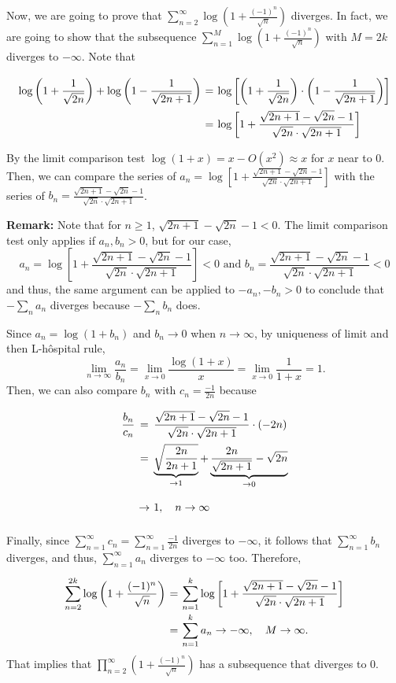 Now, we are going to prove that $\sum_{n = 2}^{\infty}\log\left( 1+\frac{(-1)^n}{\sqrt{n}} \right)$ diverges. In fact, we are going to show that the subsequence $\sum_{n = 1}^M\log\left( 1+\frac{(-1)^n}{\sqrt{n}} \right)$ with $M = 2k$ diverges to $-\infty$. Note that
\[ \everymath{\displaystyle}
\arraycolsep=1.8pt\def\arraystretch{2.5}
\begin{array}{rcl}
    \log\left( 1+\frac{1}{\sqrt{2n}} \right) +  \log\left( 1-\frac{1}{\sqrt{2n+1}} \right) & = & \log \left[ \left( 1+\frac{1}{\sqrt{2n}} \right) \cdot \left( 1-\frac{1}{\sqrt{2n+1}} \right) \right]\\
    & = & \log\left[1 + \frac{\sqrt{2n+1}-\sqrt{2n}-1}{\sqrt{2n} \cdot \sqrt{2n+1}} \right]
\end{array} \]

By the limit comparison test $\log(1+x) = x - O(x^{2}) \approx x$ for $x$ near to 0. Then, we can compare the series of $ a_n = \log\left[1 + \frac{\sqrt{2n+1}-\sqrt{2n}-1}{\sqrt{2n} \cdot \sqrt{2n+1}} \right]$ with the series of $b_n = \frac{\sqrt{2n+1}-\sqrt{2n}-1}{\sqrt{2n} \cdot \sqrt{2n+1}}$. 

\textbf{Remark:} Note that for $n \geq 1$, $\sqrt{2n+1}-\sqrt{2n}-1 < 0 $. The limit comparison test only applies if $a_n, b_n > 0$, but for our case,
\[ a_n = \log\left[1 + \frac{\sqrt{2n+1}-\sqrt{2n}-1}{\sqrt{2n} \cdot \sqrt{2n+1}} \right] < 0 \mbox{ and } b_n = \frac{\sqrt{2n+1}-\sqrt{2n}-1}{\sqrt{2n} \cdot \sqrt{2n+1}} < 0 \]
and thus, the same argument can be applied to $-a_n, -b_n > 0$ to conclude that $-\sum_n a_n$ diverges because $-\sum_n b_n$ does.

Since $a_n = \log(1+b_n)$ and $b_n \to 0$ when $n\to \infty$, by uniqueness of limit and then L-hôspital rule,
\[ \lim_{n\to\infty} \frac{a_n}{b_n} = \lim_{x\to 0} \frac{\log(1+x)}{x} = \lim_{x\to 0} \frac{1}{1+x} = 1. \]
Then, we can also compare $b_n$ with $c_n = \frac{-1}{2n}$ because
\[ \everymath{\displaystyle}
\arraycolsep=1.8pt\def\arraystretch{2.5}
\begin{array}{rcl}
    \frac{b_n}{c_n} & = & \frac{\sqrt{2n+1}-\sqrt{2n}-1}{\sqrt{2n} \cdot \sqrt{2n+1}} \cdot (-2n) \\
    & = & \underbrace{\sqrt{\frac{2n}{2n+1}}}_{\to 1} + \underbrace{\frac{2n}{\sqrt{2n+1}} - \sqrt{2n}}_{\to 0}\\
    & \to & 1,\quad n\to \infty
\end{array} \]

Finally, since $\sum_{n = 1}^{\infty} c_n = \sum_{n = 1}^{\infty} \frac{-1}{2n} $ diverges to $-\infty$, it follows that $\sum_{n = 1}^{\infty} b_n$ diverges, and thus, $\sum_{n = 1}^{\infty} a_n$ diverges to $-\infty$ too. Therefore,
\[ \everymath{\displaystyle}
\arraycolsep=1.8pt\def\arraystretch{2.5}
\begin{array}{rcl}
    \sum_{n = 2}^{2k}\log\left( 1+\frac{(-1)^n}{\sqrt{n}} \right) & = & \sum_{n = 1}^{k} \log\left[1 + \frac{\sqrt{2n+1}-\sqrt{2n}-1}{\sqrt{2n} \cdot \sqrt{2n+1}} \right]\\
     & = & \sum_{n = 1}^{k} a_n \to -\infty,\quad M \to \infty.
\end{array}  \]
That implies that $\prod_{n = 2}^{\infty} \left( 1+\frac{(-1)^n}{\sqrt{n}} \right)$ has a subsequence that diverges to 0.